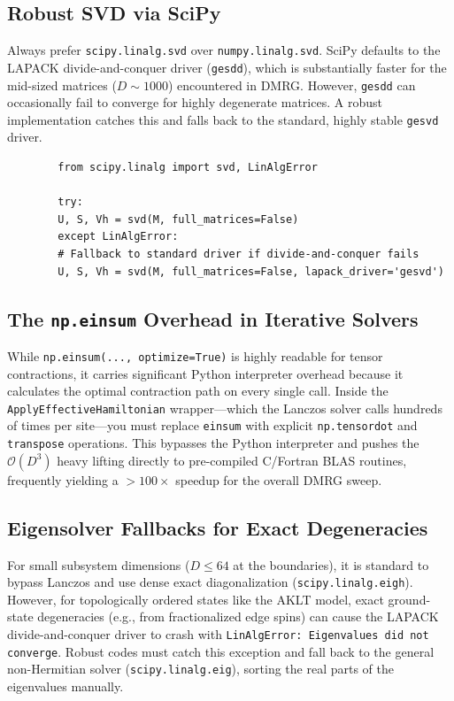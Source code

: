 \documentclass[aps,prb,onecolumn,scriptaddress]{revtex4-2}
\newcommand{\Order}{\mathcal{O}}
\begin{document}
	\subsection{Robust SVD via SciPy}
	Always prefer \texttt{scipy.linalg.svd} over \texttt{numpy.linalg.svd}. SciPy defaults to the LAPACK divide-and-conquer driver (\texttt{gesdd}), which is substantially faster for the mid-sized matrices ($D \sim 1000$) encountered in DMRG. However, \texttt{gesdd} can occasionally fail to converge for highly degenerate matrices. A robust implementation catches this and falls back to the standard, highly stable \texttt{gesvd} driver.
	
	\begin{verbatim}
		from scipy.linalg import svd, LinAlgError
		
		try:
		U, S, Vh = svd(M, full_matrices=False)
		except LinAlgError:
		# Fallback to standard driver if divide-and-conquer fails
		U, S, Vh = svd(M, full_matrices=False, lapack_driver='gesvd')
	\end{verbatim}
	
	\subsection{The \texttt{np.einsum} Overhead in Iterative Solvers}
	While \texttt{np.einsum(..., optimize=True)} is highly readable for tensor contractions, it carries significant Python interpreter overhead because it calculates the optimal contraction path on every single call. Inside the \texttt{ApplyEffectiveHamiltonian} wrapper—which the Lanczos solver calls hundreds of times per site—you must replace \texttt{einsum} with explicit \texttt{np.tensordot} and \texttt{transpose} operations. This bypasses the Python interpreter and pushes the $\Order(D^3)$ heavy lifting directly to pre-compiled C/Fortran BLAS routines, frequently yielding a $>100\times$ speedup for the overall DMRG sweep.
	
	\subsection{Eigensolver Fallbacks for Exact Degeneracies}
	For small subsystem dimensions ($D \le 64$ at the boundaries), it is standard to bypass Lanczos and use dense exact diagonalization (\texttt{scipy.linalg.eigh}). However, for topologically ordered states like the AKLT model, exact ground-state degeneracies (e.g., from fractionalized edge spins) can cause the LAPACK divide-and-conquer driver to crash with \texttt{LinAlgError: Eigenvalues did not converge}. Robust codes must catch this exception and fall back to the general non-Hermitian solver (\texttt{scipy.linalg.eig}), sorting the real parts of the eigenvalues manually.
	
\end{document}
